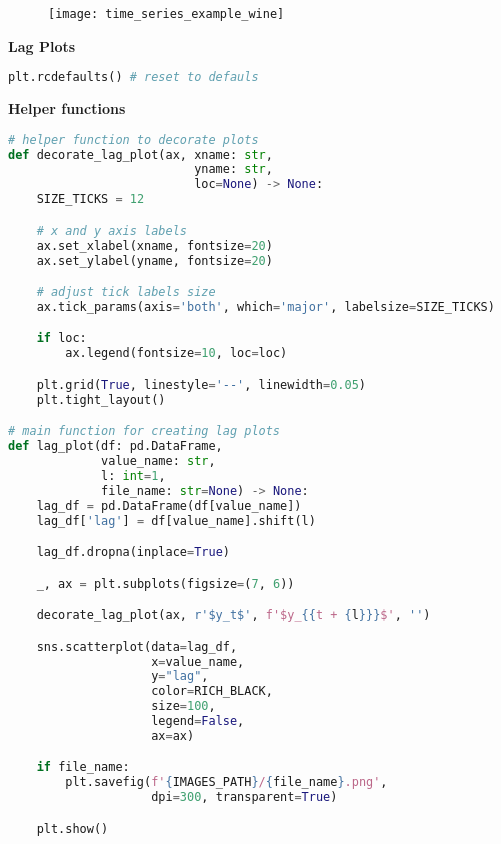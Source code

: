 \begin{figure}[h!]
  \centering
  \texttt{[image: time\_series\_example\_wine]}
\end{figure}\newpage


\begin{center}
  \noindent\normalsize\bfseries
  Lag Plots
\end{center}\vspace{-17.5pt}

\begin{center}
  \begin{lstlisting}[language=Python]
plt.rcdefaults() # reset to defauls
  \end{lstlisting}
\end{center}

{\noindent\hspace{-12.5pt}\normalsize\bfseries Helper functions}\vspace{-10pt}
\begin{center}
  \begin{lstlisting}[language=Python]
# helper function to decorate plots
def decorate_lag_plot(ax, xname: str, 
                          yname: str, 
                          loc=None) -> None:
    SIZE_TICKS = 12

    # x and y axis labels
    ax.set_xlabel(xname, fontsize=20)
    ax.set_ylabel(yname, fontsize=20)

    # adjust tick labels size
    ax.tick_params(axis='both', which='major', labelsize=SIZE_TICKS)

    if loc:
        ax.legend(fontsize=10, loc=loc)

    plt.grid(True, linestyle='--', linewidth=0.05)
    plt.tight_layout()

# main function for creating lag plots
def lag_plot(df: pd.DataFrame, 
             value_name: str, 
             l: int=1, 
             file_name: str=None) -> None:
    lag_df = pd.DataFrame(df[value_name])
    lag_df['lag'] = df[value_name].shift(l)

    lag_df.dropna(inplace=True)

    _, ax = plt.subplots(figsize=(7, 6))

    decorate_lag_plot(ax, r'$y_t$', f'$y_{{t + {l}}}$', '')

    sns.scatterplot(data=lag_df, 
                    x=value_name,
                    y="lag", 
                    color=RICH_BLACK, 
                    size=100, 
                    legend=False, 
                    ax=ax)

    if file_name:
        plt.savefig(f'{IMAGES_PATH}/{file_name}.png', 
                    dpi=300, transparent=True)

    plt.show()
  \end{lstlisting}
\end{center}

